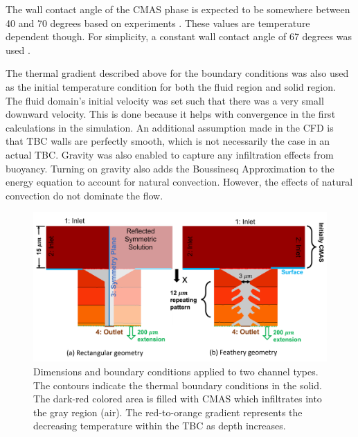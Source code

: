 \documentclass[%
 aip,
 amsmath,amssymb,
 reprint,%
]{revtex4-1}
\begin{document}
The wall contact angle of the CMAS phase is expected to be somewhere between 40 and 70 degrees based on experiments \cite{Naraparaju2019}. 
These values are temperature dependent though. For simplicity, a constant wall contact angle of 67 degrees was used \cite{Naraparaju2019}.

The thermal gradient described above for the boundary conditions was also used as the initial temperature condition for both the fluid region and solid region. The fluid domain's initial velocity was set such that there was a very small downward velocity. This is done because it helps with convergence in the first calculations in the simulation.  An additional assumption made in the CFD is that TBC walls are perfectly smooth, which is not necessarily the case in an actual TBC.  Gravity was also enabled to capture any infiltration effects from buoyancy. Turning on gravity also adds the Boussinesq Approximation to the energy equation to account for natural convection. However, the effects of natural convection do not dominate the flow. 


\begin{figure}
    \centering
    \includegraphics[width=0.9\linewidth]{Figures/dimensionsTwoView.png}
    \caption{Dimensions and boundary conditions applied to two channel types. The contours indicate the thermal boundary conditions in the solid. The dark-red colored area is filled with CMAS which infiltrates into the gray region (air). The red-to-orange gradient represents the decreasing temperature within the TBC as depth increases.}
    \label{fig:dimensions}
\end{figure}
\end{document}
